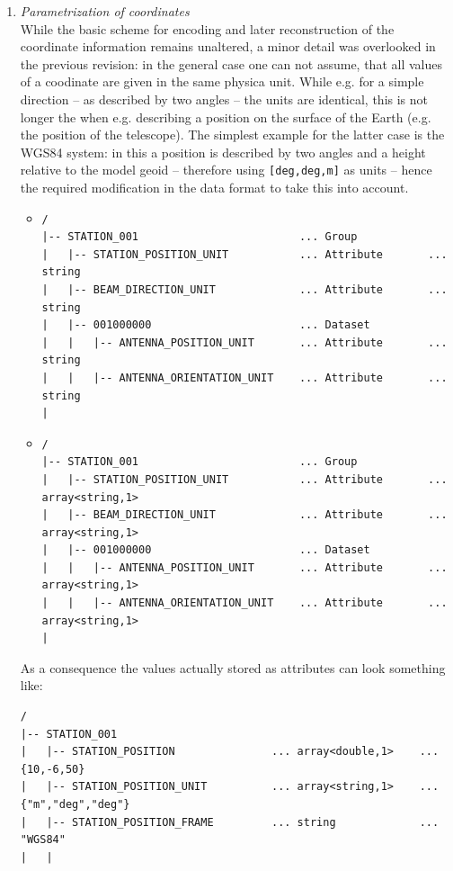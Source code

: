 \documentclass[a4paper,10pt,bibtotoc]{scrartcl}
\begin{document}
\begin{enumerate}
\item \textit{Parametrization of coordinates} \\
  While the basic scheme for encoding and later reconstruction of the
  coordinate information remains unaltered, a minor detail was overlooked in
  the previous revision: in the general case one can not assume, that all
  values of a coodinate are given in the same physica unit. While e.g. for
  a simple direction -- as described by two angles -- the units are identical,
  this is not longer the when e.g. describing a position on the surface of
  the Earth (e.g. the position of the telescope). The simplest example for
  the latter case is the WGS84 system: in this a position is described by
  two angles and a height relative to the model geoid -- therefore using
  \verb|[deg,deg,m]| as units -- hence the required modification in the data
  format to take this into account.
  \begin{itemize}
  \item[\underline{old}:]
    {\small
\begin{verbatim}
/
|-- STATION_001                         ... Group
|   |-- STATION_POSITION_UNIT           ... Attribute       ... string
|   |-- BEAM_DIRECTION_UNIT             ... Attribute       ... string
|   |-- 001000000                       ... Dataset
|   |   |-- ANTENNA_POSITION_UNIT       ... Attribute       ... string
|   |   |-- ANTENNA_ORIENTATION_UNIT    ... Attribute       ... string
|
\end{verbatim}}
  \item[\underline{new}:]
    {\small
\begin{verbatim}
/
|-- STATION_001                         ... Group
|   |-- STATION_POSITION_UNIT           ... Attribute       ... array<string,1>
|   |-- BEAM_DIRECTION_UNIT             ... Attribute       ... array<string,1>
|   |-- 001000000                       ... Dataset
|   |   |-- ANTENNA_POSITION_UNIT       ... Attribute       ... array<string,1>
|   |   |-- ANTENNA_ORIENTATION_UNIT    ... Attribute       ... array<string,1>
|
\end{verbatim}}
  \end{itemize}
  As a consequence the values actually stored as attributes can look something
  like:
{\small
\begin{verbatim}
/
|-- STATION_001
|   |-- STATION_POSITION               ... array<double,1>    ...  {10,-6,50}
|   |-- STATION_POSITION_UNIT          ... array<string,1>    ...  {"m","deg","deg"}
|   |-- STATION_POSITION_FRAME         ... string             ...  "WGS84"
|   |
\end{verbatim}}
\end{enumerate}
\end{document}
